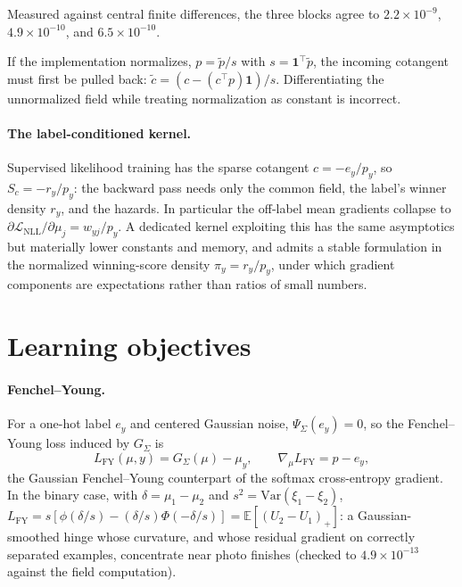 \documentclass[11pt]{article}
\theoremstyle{remark}
\newcommand{\E}{\mathbb{E}}
\begin{document}
Measured against central finite differences, the three blocks agree to
$2.2\times10^{-9}$, $4.9\times10^{-10}$, and $6.5\times10^{-10}$.

If the implementation normalizes, $p = \tilde p / s$ with $s =
\mathbf{1}^\top \tilde p$, the incoming cotangent must first be pulled
back: $\tilde c = (c - (c^\top p)\mathbf{1})/s$. Differentiating the
unnormalized field while treating normalization as constant is
incorrect.

\paragraph{The label-conditioned kernel.} Supervised likelihood
training has the sparse cotangent $c = -e_y / p_y$, so $S_c = -r_y /
p_y$: the backward pass needs only the common field, the label's winner
density $r_y$, and the hazards. In particular the off-label mean
gradients collapse to $\partial \mathcal{L}_{\mathrm{NLL}} / \partial
\mu_j = w_{yj}/p_y$. A dedicated kernel exploiting this has the same
asymptotics but materially lower constants and memory, and admits a
stable formulation in the normalized winning-score density $\pi_y =
r_y / p_y$, under which gradient components are expectations rather
than ratios of small numbers.

\section{Learning objectives}\label{sec:losses}

\paragraph{Fenchel--Young.} For a one-hot label $e_y$ and centered
Gaussian noise, $\Psi_\Sigma(e_y) = 0$, so the Fenchel--Young loss
induced by $G_\Sigma$ is
\[
L_{\mathrm{FY}}(\mu, y) = G_\Sigma(\mu) - \mu_y, \qquad
\nabla_\mu L_{\mathrm{FY}} = p - e_y ,
\]
the Gaussian Fenchel--Young counterpart of the softmax cross-entropy
gradient. In the binary case, with $\delta = \mu_1 - \mu_2$ and $s^2 =
\mathrm{Var}(\xi_1 - \xi_2)$, $L_{\mathrm{FY}} = s[\phi(\delta/s) -
(\delta/s)\Phi(-\delta/s)] = \E[(U_2 - U_1)_+]$: a Gaussian-smoothed
hinge whose curvature, and whose residual gradient on correctly
separated examples, concentrate near photo finishes (checked to
$4.9\times10^{-13}$ against the field computation).
\end{document}
